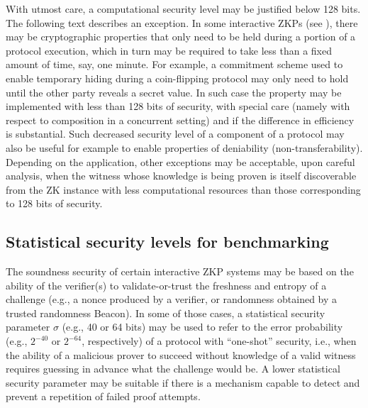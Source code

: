 \label{par:security:efficiency:comp-sec-levels:exception}
With utmost care, a computational security level may be justified below 128 bits.
The following text describes an exception.
In some interactive ZKPs (see ), there may be cryptographic properties that only need to be held during a portion of a protocol execution, which in turn may be required to take less than a fixed amount of time, say, one minute.
For example, a commitment scheme used to enable temporary hiding during a coin-flipping protocol may only need to hold until the other party reveals a secret value.
In such case the property may be implemented with less than 128 bits of security, with special care (namely with respect to composition in a concurrent setting) and if the difference in efficiency is substantial.
Such decreased security level of a component of a protocol may also be useful for example to enable properties of deniability (non-transferability).
Depending on the application, other exceptions may be acceptable, upon careful analysis, when the witness whose knowledge is being proven is itself discoverable from the ZK instance with less computational resources than those corresponding to 128 bits of security. 


\vspace{-.5em} %
\subsection{Statistical security levels for benchmarking}
\label{security:efficiency:stat-sec-levels}

\vspace{-.35em} %
The soundness security of certain interactive ZKP systems may be based on the ability of the verifier(s) to validate-or-trust the freshness and entropy of a challenge (e.g., a nonce produced by a verifier, or randomness obtained by a trusted randomness Beacon).
In some of those cases, a statistical security parameter $\sigma$ (e.g., 40 or 64 bits) may be used to refer to the error probability (e.g., $2^{-40}$ or $2^{-64}$, respectively) of a protocol with ``one-shot'' security, i.e., when the ability of a malicious prover to succeed without knowledge of a valid witness requires guessing in advance what the challenge would be.
A lower statistical security parameter may be suitable if there is a mechanism capable to detect and prevent a repetition of failed proof attempts.

